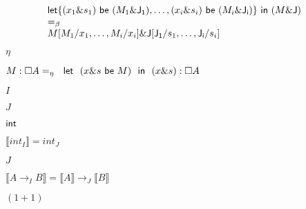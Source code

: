 \documentclass[10pt]{book}
\begin{document}
\begin{mdSnippets}
\begin{mdDisplaySnippet}
\[%
\begin{array}{ll} 
    {\sf let} \{(x_1 \& s_1) {\ \sf be\ } (M_1\& {\sf J_1}),\ldots,  (x_i \& s_i) {\ {\sf be}\ } (M_i\& {\sf J_i})\}\ {\sf in}\  (M \&  {\sf J})& \\
    =_{\beta} & \\
  {  M[M_1/x_1, \ldots,  M_i/x_i] \& {\sf J}[{\sf J_1}/s_1,\ldots, {\sf J_i}/s_i]}
    \end{array}
\]%
\end{mdDisplaySnippet}%
\begin{mdInlineSnippet}[ffe9f913124f345732e9f00fa258552e]%
$\eta$\end{mdInlineSnippet}%
\begin{mdInlineSnippet}%
$M:\Box A =_{\eta}\ \ {\sf let} \ \ (x \& s\  {\sf be} \ M)\ \ {\sf in}\ \  { (x \& s)}:\Box A$\end{mdInlineSnippet}%
\begin{mdInlineSnippet}[dd7536794b63bf90eccfd37f9b147d7f]%
$I$\end{mdInlineSnippet}%
\begin{mdInlineSnippet}%
$J$\end{mdInlineSnippet}%
\begin{mdInlineSnippet}[5816dd164bf4957e60b9dc378faadd4a]%
${\sf int}$\end{mdInlineSnippet}%
\begin{mdInlineSnippet}[168da4daa211ad39e7e2f103d4697538]%
$\llbracket int_I\rrbracket = int_J $\end{mdInlineSnippet}%
\begin{mdInlineSnippet}%
$J$\end{mdInlineSnippet}%
\begin{mdInlineSnippet}[3770b5b04be251b0fdf3f4fc0a74d5fe]%
$\llbracket A\rightarrow_I B\rrbracket =\llbracket A \rrbracket \rightarrow_J \llbracket B \rrbracket $\end{mdInlineSnippet}%
\begin{mdInlineSnippet}[084d81b8c5dc70186c48137b0f155453]%
$(1+1)$\end{mdInlineSnippet}%
\begin{mdInlineSnippet}[4fd47922d2b9f5b8fc0bc97eeb6394fb]%

\end{mdInlineSnippet}
\end{mdSnippets}
\end{document}
